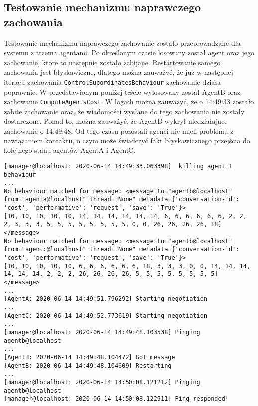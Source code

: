 \subsection{Testowanie mechanizmu naprawczego zachowania}
Testowanie mechanizmu naprawczego zachowanie zostało przeprowadzane dla systemu z trzema agentami. Po określonym czasie losowany został agent oraz jego zachowanie, które to następnie zostało zabijane. Restartowanie samego zachowania jest błyskawiczne, dlatego można zauważyć, że już w następnej iteracji zachowania \texttt{ControlSubordinatesBehaviour} zachowanie działa poprawnie. W przedstawionym poniżej teście wylosowany został AgentB oraz zachowanie \texttt{ComputeAgentsCost}. W logach można zauważyć, że o 14:49:33 zostało zabite zachowanie oraz, że wiadomości wysłane do tego zachowania nie zostały dostarczone. Ponad to, można zauważyć, że AgentB wykrył niedziałające zachowanie o 14:49:48. Od tego czasu pozostali agenci nie mieli problemu z nawiązaniem kontaktu, o czym może świadczyć fakt błyskawicznego przejścia do kolejnego stanu agentów AgentA i AgentC.
\begin{lstlisting}
[manager@localhost: 2020-06-14 14:49:33.063398]  killing agent 1 behaviour 
...
No behaviour matched for message: <message to="agentb@localhost" from="agenta@localhost" thread="None" metadata={'conversation-id': 'cost', 'performative': 'request', 'save': 'True'}>
[10, 10, 10, 10, 10, 14, 14, 14, 14, 14, 14, 6, 6, 6, 6, 6, 6, 2, 2, 2, 3, 3, 3, 5, 5, 5, 5, 5, 5, 5, 5, 0, 0, 26, 26, 26, 26, 18]
</message>
No behaviour matched for message: <message to="agentb@localhost" from="agentc@localhost" thread="None" metadata={'conversation-id': 'cost', 'performative': 'request', 'save': 'True'}>
[10, 10, 10, 10, 10, 6, 6, 6, 6, 6, 6, 18, 3, 3, 3, 0, 0, 14, 14, 14, 14, 14, 14, 2, 2, 2, 26, 26, 26, 26, 5, 5, 5, 5, 5, 5, 5, 5]
</message>
...
[AgentA: 2020-06-14 14:49:51.796292] Starting negotiation
...
[AgentC: 2020-06-14 14:49:52.773619] Starting negotiation
...
[manager@localhost: 2020-06-14 14:49:48.103538] Pinging agentb@localhost
...
[AgentB: 2020-06-14 14:49:48.104472] Got message
[AgentB: 2020-06-14 14:49:48.104609] Restarting
...
[manager@localhost: 2020-06-14 14:50:08.121212] Pinging agentb@localhost
[manager@localhost: 2020-06-14 14:50:08.122911] Ping responded!
\end{lstlisting}
